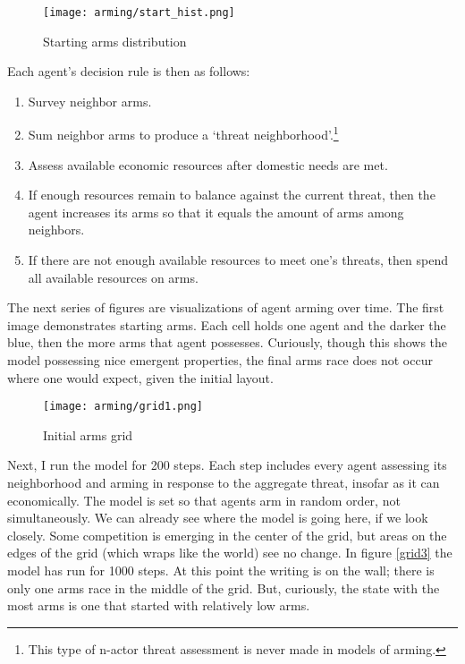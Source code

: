 \documentclass[12pt]{article}
\begin{document}
\begin{figure}
    \centering
    \texttt{[image: arming/start\_hist.png]}
    \caption{Starting arms distribution}
    \label{starthist}
\end{figure}

\noindent Each agent's decision rule is then as follows:

\begin{enumerate}
    \item Survey neighbor arms.
    \item Sum neighbor arms to produce a `threat neighborhood'.\footnote{This type of n-actor threat assessment is never made in models of arming.}
    \item Assess available economic resources after domestic needs are met.
    \item If enough resources remain to balance against the current threat, then the agent increases its arms so that it equals the amount of arms among neighbors.
    \item If there are not enough available resources to meet one's threats, then spend all available resources on arms.
\end{enumerate}

The next series of figures are visualizations of agent arming over time. The first image demonstrates starting arms. Each cell holds one agent and the darker the blue, then the more arms that agent possesses. Curiously, though this shows the model possessing nice emergent properties, the final arms race does not occur where one would expect, given the initial layout.

\begin{figure}
    \centering
    \texttt{[image: arming/grid1.png]}
    \caption{Initial arms grid}
    \label{grid1}
\end{figure}

Next, I run the model for 200 steps. Each step includes every agent assessing its neighborhood and arming in response to the aggregate threat, insofar as it can economically. The model is set so that agents arm in random order, not simultaneously. We can already see where the model is going here, if we look closely. Some competition is emerging in the center of the grid, but areas on the edges of the grid (which wraps like the world) see no change. In figure \ref{grid3} the model has run for 1000 steps. At this point the writing is on the wall; there is only one arms race in the middle of the grid. But, curiously, the state with the most arms is one that started with relatively low arms.
\end{document}
